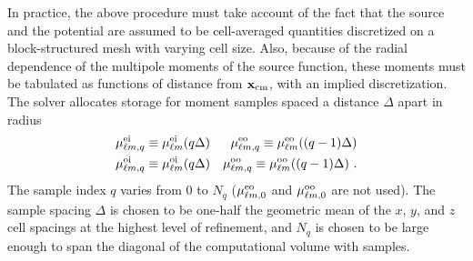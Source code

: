 In practice, the above procedure must take account of the fact that the
source and the potential are assumed to be cell-averaged
quantities discretized on a block-structured mesh with varying cell size.
Also, because of the radial dependence of the multipole moments of the
source function, these moments must be tabulated as functions of distance from
${\bf x}_{\rm cm}$, with an implied discretization.  The solver allocates
storage for moment samples spaced a distance $\Delta$ apart in radius
\begin{eqnarray}
\mu^{\rm ei}_{\ell m,q}\equiv \mu^{\rm ei}_{\ell m}(q\Delta) &&
\mu^{\rm eo}_{\ell m,q}\equiv \mu^{\rm eo}_{\ell m}((q-1)\Delta) \\
\mu^{\rm oi}_{\ell m,q}\equiv \mu^{\rm oi}_{\ell m}(q\Delta) &&
\mu^{\rm oo}_{\ell m,q}\equiv \mu^{\rm oo}_{\ell m}((q-1)\Delta)\ .
\end{eqnarray}
The sample index $q$ varies from 0 to $N_q$ ($\mu^{\rm eo}_{\ell m,0}$ and
$\mu^{\rm oo}_{\ell m,0}$ are not used).  The sample spacing $\Delta$ is
chosen to be one-half the geometric mean of the $x$, $y$, and $z$ cell spacings
at the highest level of refinement, and $N_q$ is chosen to be large enough
to span the diagonal of the computational volume with samples.

